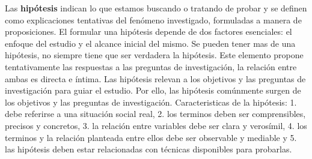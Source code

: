\documentclass[conference]{IEEEtran}
\begin{document}
Las \textbf{hipótesis} indican lo que estamos buscando o tratando de probar y se definen como explicaciones tentativas del fenómeno investigado, formuladas a manera de proposiciones. El formular una hipótesis depende de dos factores esenciales: el enfoque del estudio y el alcance inicial del mismo. Se pueden tener mas de una hipótesis, no siempre tiene que ser verdadera la hipótesis. Este elemento propone tentativamente las respuestas a las preguntas de investigación, la relación entre ambas es directa e íntima. Las hipótesis relevan a los objetivos y las preguntas de investigación para guiar el estudio. Por ello, las hipótesis comúnmente surgen de los objetivos y las preguntas de investigación. Caracteristicas de la hipótesis: 1. debe referirse a una situación social real, 2. los terminos deben ser comprensibles, precisos y concretos, 3. la relación entre variables debe ser clara y verosímil, 4. los terminos y la relación planteada entre ellos debe ser observable y mediable y 5. las hipótesis deben estar relacionadas con técnicas disponibles para probarlas. 

\printbibliography
\end{document}
